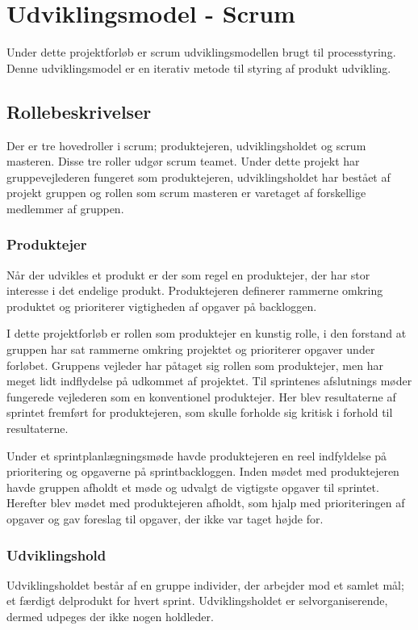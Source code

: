 \chapter{Udviklingsmodel - Scrum}
Under dette projektforløb er scrum udviklingsmodellen brugt til processtyring. Denne udviklingsmodel er en iterativ metode til styring af produkt udvikling.


\section{Rollebeskrivelser}
Der er tre hovedroller i scrum; produktejeren, udviklingsholdet og scrum masteren. Disse tre roller udgør scrum teamet. Under dette projekt har gruppevejlederen fungeret som produktejeren, udviklingsholdet har bestået af projekt gruppen og rollen som scrum masteren er varetaget af forskellige medlemmer af gruppen.

\subsection{Produktejer}
Når der udvikles et produkt er der som regel en produktejer, der har stor interesse i det endelige produkt. Produktejeren definerer rammerne omkring produktet og prioriterer vigtigheden af opgaver på backloggen. \newline

I dette projektforløb er rollen som produktejer en kunstig rolle, i den forstand at gruppen har sat rammerne omkring projektet og prioriterer opgaver under forløbet. Gruppens vejleder har påtaget sig rollen som produktejer, men har meget lidt indflydelse på udkommet af projektet. Til sprintenes afslutnings møder fungerede vejlederen som en konventionel produktejer. Her blev resultaterne af sprintet fremført for produktejeren, som skulle forholde sig kritisk i forhold til resultaterne.

Under et sprintplanlægningsmøde havde produktejeren en reel indfyldelse på prioritering og opgaverne på sprintbackloggen. Inden mødet med produktejeren havde gruppen afholdt et møde og udvalgt de vigtigste opgaver til sprintet. Herefter blev mødet med produktejeren afholdt, som hjalp med prioriteringen af opgaver og gav foreslag til opgaver, der ikke var taget højde for.  

\subsection{Udviklingshold}
Udviklingsholdet består af en gruppe individer, der arbejder mod et samlet mål; et færdigt delprodukt for hvert sprint. Udviklingsholdet er selvorganiserende, dermed udpeges der ikke nogen holdleder. \newline

